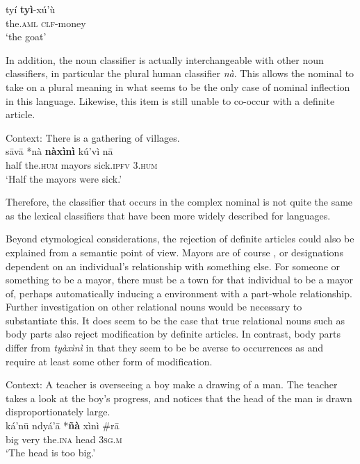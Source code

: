 \documentclass[output=paper,modfonts,nonflat]{langsci/langscibook}
\begin{document}
\ea {}\label{ex:cisneros:83}
\gll
ty\'i \textbf{ty\`i}-x\'u'\`u\\
the.\textsc{aml} \textsc{clf}-money\\
\glt
`the goat'
\z 

In addition, the noun classifier is actually interchangeable with other noun classifiers, in particular the plural human classifier \textit{n\`a}.  This allows the nominal to take on a plural  meaning in what seems to be the only case of nominal inflection in this language.  Likewise, this item is still unable to co-occur with a definite article.

\ea {}\label{ex:cisneros:84}
Context: There is a gathering of villages. \\
\gll
{\ob}s\=av\=a {\op}\textnormal{*}n\`a{\cp} \textbf{n\`ax\`in\`i}{\cb} k\'u'v\`i n\=a\\
{\db}half  \phantom{(*}the.\textsc{hum} mayors sick.\textsc{ipfv} 3.\textsc{hum}\\
\glt
`Half the mayors were sick.'
\z 

Therefore, the classifier that occurs in the complex nominal is not quite the same as the lexical classifiers that have been more widely described for  languages.  

Beyond etymological considerations, the rejection of definite articles could also be explained from a semantic point of view.  Mayors are of course , or designations dependent on an individual's relationship with something else.  For someone or something to be a mayor, there must be a town for that individual to be a mayor of, perhaps automatically inducing a  environment with a part-whole relationship.  Further investigation on other relational nouns would be necessary to substantiate this.  It does seem to be the case that true relational nouns such as body parts also reject modification by definite articles.  In contrast, body parts differ from \textit{ty\`ax\`in\`i} in that they seem to be be averse to occurrences as  and require at least some other form of modification.

\ea {}\label{ex:cisneros:85}
Context: A teacher is overseeing a boy make a drawing of a man.  The teacher takes a look at the boy's progress, and notices that the head of the man is drawn disproportionately large.\\
\gll
k\'a'n\=u ndy\'a'\=a {\op}\textnormal{*}\textbf{\~n\`a}{\cp} x\`in\`i \textnormal{\#}{\op}r\=a{\cp}\\
big very \phantom{(*}the.\textsc{ina} head \phantom{\#(}3\textsc{sg.m}\\
\glt
`The head is too big.'
\z 
\end{document}
